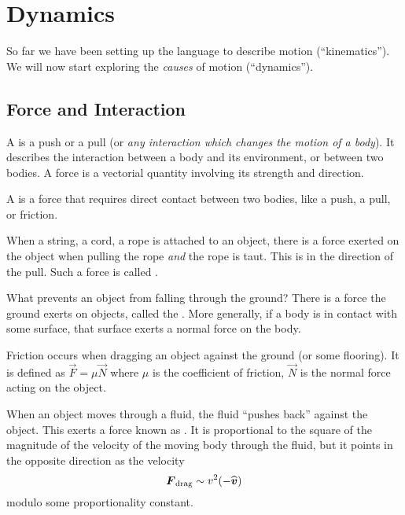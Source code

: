 \section{Dynamics}

\M
So far we have been setting up the language to describe motion
(``kinematics''). We will now start exploring the \emph{causes} of
motion (``dynamics'').

\subsection{Force and Interaction}

\begin{definition}
A  is a push or a pull (or
\emph{any interaction which changes the motion of a body}). It describes the
interaction between a body and its environment, or between two bodies. A
force is a vectorial quantity involving its strength and direction.
\end{definition}

\begin{definition}
A  is a force that requires
direct contact between two bodies, like a push, a pull, or friction.
\end{definition}

\begin{ex}[Tension]
When a string, a cord, a rope is attached to an object, there is a force
exerted on the object when pulling the rope \emph{and} the rope is taut.
This is in the direction of the pull. Such a force is called
.
\end{ex}

\begin{ex}
What prevents an object from falling through the ground? There is a
force the ground exerts on objects, called the
. More generally, if a
body is in contact with some surface, that surface exerts a normal force
on the body.
\end{ex}

\begin{ex}[Friction]
Friction occurs when dragging an object against the ground (or some
flooring). It is defined as $\vec{F}=\mu\vec{N}$ where $\mu$ is the
coefficient of friction, $\vec{N}$ is the normal force acting on the
object.
\end{ex}

\begin{ex}[Drag]
When an object moves through a fluid, the fluid ``pushes back'' against
the object. This exerts a force known as . It is
proportional to the square of the magnitude of the velocity of the
moving body through the fluid, but it points in the opposite direction
as the velocity
\begin{equation}
\vec{F}_{\text{drag}}\looksLike v^{2}(-\widehat{\vec{v}})
\end{equation}
modulo some proportionality constant.
\end{ex}

